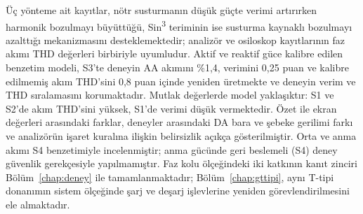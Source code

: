 Üç yönteme ait kayıtlar, nötr susturmanın düşük güçte verimi artırırken harmonik bozulmayı büyüttüğü, Sin\textsuperscript{3} teriminin ise susturma kaynaklı bozulmayı azalttığı mekanizmasını desteklemektedir; analizör ve osiloskop kayıtlarının faz akımı THD değerleri birbiriyle uyumludur. Aktif ve reaktif güce kalibre edilen benzetim modeli, S3'te deneyin AA akımını \%1,4, verimini 0,25 puan ve kalibre edilmemiş akım THD'sini 0,8 puan içinde yeniden üretmekte ve deneyin verim ve THD sıralamasını korumaktadır. Mutlak değerlerde model yaklaşıktır: S1 ve S2'de akım THD'sini yüksek, S1'de verimi düşük vermektedir. Özet ile ekran değerleri arasındaki farklar, deneyler arasındaki DA bara ve şebeke gerilimi farkı ve analizörün işaret kuralına ilişkin belirsizlik açıkça gösterilmiştir. Orta ve anma akımı S4 benzetimiyle incelenmiştir; anma gücünde geri beslemeli (S4) deney güvenlik gerekçesiyle yapılmamıştır. Faz kolu ölçeğindeki iki katkının kanıt zinciri Bölüm~\ref{chap:deney} ile tamamlanmaktadır; Bölüm~\ref{chap:gttipi}, aynı T-tipi donanımın sistem ölçeğinde şarj ve deşarj işlevlerine yeniden görevlendirilmesini ele almaktadır.
